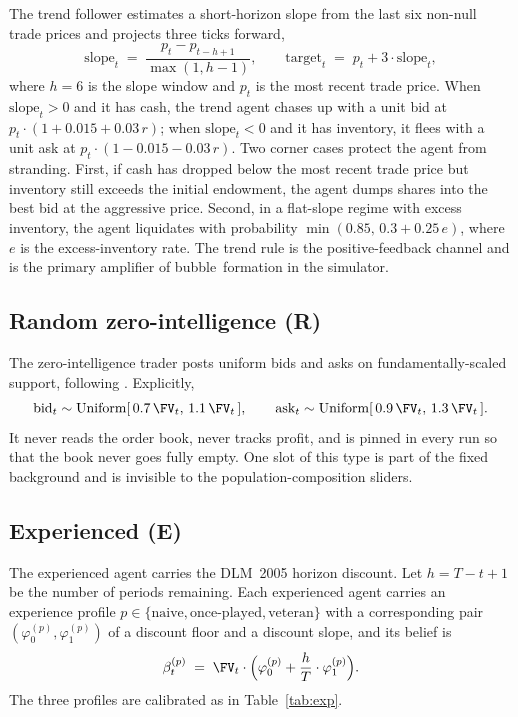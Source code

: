 The trend follower estimates a short-horizon slope from the last
six non-null trade prices and projects three ticks forward,
\begin{equation}
\text{slope}_t\;=\;\frac{p_{t}-p_{t-h+1}}{\max(1,h-1)},\qquad
\text{target}_t\;=\;p_t+3\cdot\text{slope}_t,
\label{eq:trend}
\end{equation}
where $h=6$ is the slope window and $p_t$ is the most recent trade
price. When $\text{slope}_t>0$ and it has cash, the trend agent
chases up with a unit bid at $p_t\cdot(1+0.015+0.03\,r)$; when
$\text{slope}_t<0$ and it has inventory, it flees with a unit ask
at $p_t\cdot(1-0.015-0.03\,r)$. Two corner cases protect the agent
from stranding. First, if cash has dropped below the most recent
trade price but inventory still exceeds the initial endowment, the
agent dumps shares into the best bid at the aggressive price.
Second, in a flat-slope regime with excess inventory, the agent
liquidates with probability $\min(0.85,\,0.3+0.25\,e)$, where $e$
is the excess-inventory rate. The trend rule is the positive-feedback
channel \citep{delong1990positive} and is the primary amplifier of
bubble~formation in the simulator.

\subsection{Random zero-intelligence (R)}

The zero-intelligence trader posts uniform bids and asks on
fundamentally-scaled support, following
\citet{gode1993allocative}. Explicitly,
\begin{equation}
\text{bid}_t\sim\text{Uniform}[\,0.7\,\FV_t,\,1.1\,\FV_t\,],\qquad
\text{ask}_t\sim\text{Uniform}[\,0.9\,\FV_t,\,1.3\,\FV_t\,].
\label{eq:random}
\end{equation}
It never reads the order book, never tracks profit, and is pinned
in every run so that the book never goes fully empty. One slot of
this type is part of the fixed background and is invisible to the
population-composition sliders.

\subsection{Experienced (E)}

The experienced agent carries the DLM~2005 horizon discount. Let
$h=T-t+1$ be the number of periods remaining. Each experienced
agent carries an experience profile $p\in\{\text{naive},
\text{once-played},\text{veteran}\}$ with a corresponding pair
$(\varphi_0^{(p)},\varphi_1^{(p)})$ of a discount floor and a
discount slope, and its belief is
\begin{equation}
\beta_t^{(p)} \;=\; \FV_t\cdot\Bigl(\varphi_0^{(p)}+\frac{h}{T}\cdot\varphi_1^{(p)}\Bigr).
\label{eq:exp_belief}
\end{equation}
The three profiles are calibrated as in Table~\ref{tab:exp}.

